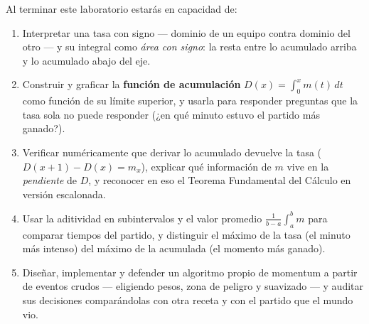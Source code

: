 \documentclass[12pt,letterpaper]{article}
\begin{document}
\begin{cajalogros}
Al terminar este laboratorio estarás en capacidad de:
\begin{enumerate}[label=\arabic*., itemsep=0.1em]
    \item Interpretar una tasa con signo --- dominio de un equipo contra dominio del otro --- y su integral como \emph{área con signo}: la resta entre lo acumulado arriba y lo acumulado abajo del eje.
    \item Construir y graficar la \textbf{función de acumulación} $D(x)=\int_0^x m(t)\,dt$ como función de su límite superior, y usarla para responder preguntas que la tasa sola no puede responder (¿en qué minuto estuvo el partido más ganado?).
    \item Verificar numéricamente que derivar lo acumulado devuelve la tasa ($D(x+1)-D(x)=m_x$), explicar qué información de $m$ vive en la \emph{pendiente} de $D$, y reconocer en eso el Teorema Fundamental del Cálculo en versión escalonada.
    \item Usar la aditividad en subintervalos y el valor promedio $\frac{1}{b-a}\int_a^b m$ para comparar tiempos del partido, y distinguir el máximo de la tasa (el minuto más intenso) del máximo de la acumulada (el momento más ganado).
    \item Diseñar, implementar y defender un algoritmo propio de momentum a partir de eventos crudos --- eligiendo pesos, zona de peligro y suavizado --- y auditar sus decisiones comparándolas con otra receta y con el partido que el mundo vio.
\end{enumerate}
\end{cajalogros}
\end{document}
